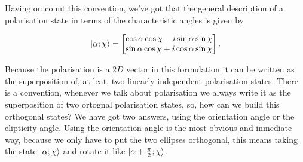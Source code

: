             Having on count this convention, we've got that the general description of a polarisation state in terms of the characteristic angles is given by 

            \begin{equation}\label{eq:JonesKet}
                \ket{\alpha;\chi} =
                \begin{bmatrix}
                    \cos\alpha \cos\chi - i\sin\alpha \sin\chi \\
                    \sin\alpha \cos\chi + i\cos\alpha\sin\chi
                \end{bmatrix}.
            \end{equation}

            Because the polarisation is a $2D$ vector in this formulation it can be written as the superposition of, at leat, two linearly independent polarisation states. There is a convention, whenever we talk about polarisation we always write it as the superposition of two ortognal polarisation states, so, how can we build this orthogonal states? We have got two answers, using the orientation angle or the elipticity angle. Using the orientation angle is the most obvious and inmediate way, because we only have to put the two ellipses orthogonal, this means taking the state $\ket{\alpha;\chi}$ and rotate it like $\ket{\alpha + \frac{\pi}{2};\chi}$.

